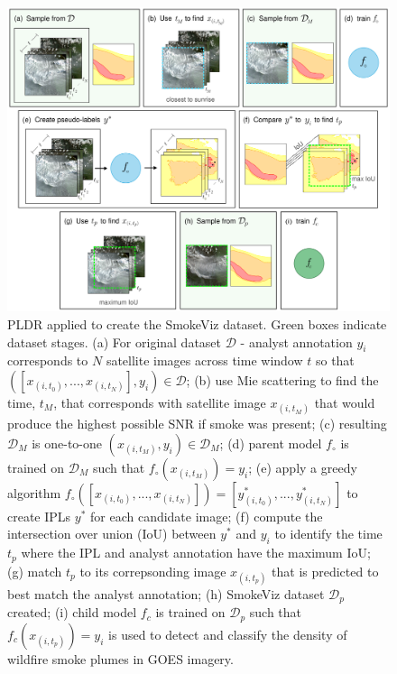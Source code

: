 \documentclass{article}
\begin{document}
\begin{figure}[!htb]
    \centering
    \includegraphics[width=\linewidth]{figures/workflow_small.png}
    \caption{
        PLDR applied to create the SmokeViz dataset. Green boxes indicate dataset stages. 
        (a) For original dataset \(\mathcal{D}\) - analyst annotation \(y_i\) corresponds to \(N\) satellite images across time window \(t\) so that \(([x_{(i,t_0)},...,x_{(i,t_N)}], y_i) \in \mathcal{D}\); 
        (b) use Mie scattering to find the time, \(t_M\), that corresponds with satellite image \(x_{(i,t_M)}\) that would produce the highest possible SNR if smoke was present; 
        (c) resulting \(\mathcal{D}_M\) is one-to-one \((x_{(i,t_M)}, y_i) \in \mathcal{D}_M\);
        (d) parent model \(f_\circ\) is trained on \(\mathcal{D}_M\) such that \(f_\circ(x_{(i,t_M)})=y_i\);
        (e) apply a greedy algorithm \(f_\circ([x_{(i,t_0)},...,x_{(i,t_N)}])=[y^*_{(i,t_0)},...,y^*_{(i,t_N)}]\) to create IPLs \(y^*\) for each candidate image; 
        (f) compute the intersection over union (IoU) between \(y^*\) and \(y_i\) to identify the time \(t_p\) where the IPL and analyst annotation have the maximum IoU; 
        (g) match \(t_p\) to its correpsonding image \(x_{(i,t_p)}\) that is predicted to best match the analyst annotation;
        (h) SmokeViz dataset \(\mathcal{D}_p\) created; 
        (i) child model \(f_c\) is trained on \(\mathcal{D}_p\) such that \(f_c(x_{(i,t_p)})=y_i\) is used to detect and classify the density of wildfire smoke plumes in GOES imagery.
    }
\label{PLDR}
\end{figure}
\end{document}
